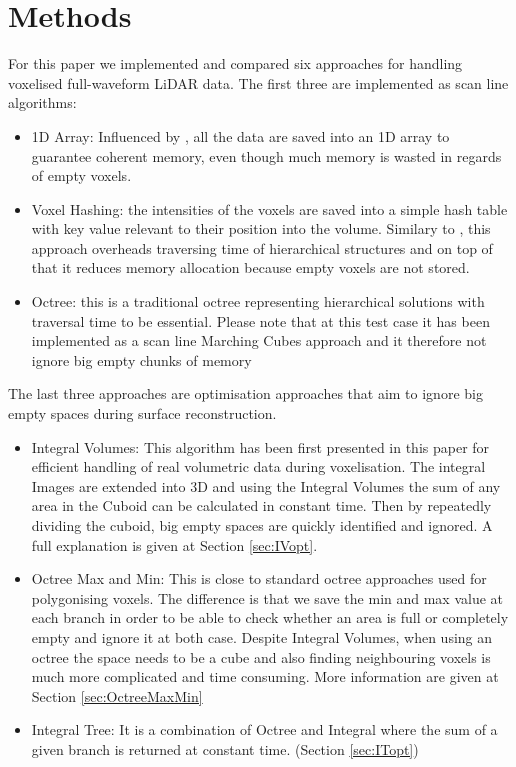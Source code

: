 \documentclass{subfiles}
\begin{document}




\section{Methods}\label{sec:methods}
For this paper we implemented and compared six approaches for handling voxelised full-waveform LiDAR data. The first three are implemented as scan line algorithms: 

\begin{itemize}
	\item 1D Array: Influenced by \cite{Hadwiger2012}, all the data are saved into an 1D array to guarantee coherent memory, even though much memory is wasted in regards of empty voxels.  
	\item Voxel Hashing: the intensities of the voxels are saved into a simple hash table with key value relevant to their position into the volume. Similary to \cite{Nievner2016voxelHashing}, this approach overheads traversing time of hierarchical structures and on top of that it reduces memory allocation because empty voxels are not stored. 
	\item Octree: this is a traditional octree representing hierarchical solutions with traversal time to be essential. Please note that at this test case it has been implemented as a scan line Marching Cubes approach and it therefore not ignore big empty chunks of memory
\end{itemize}

The last three approaches are optimisation approaches that aim to ignore big empty spaces during surface reconstruction. 
\begin{itemize}
	\item Integral Volumes: This algorithm has been first presented in this paper for efficient handling of real volumetric data during voxelisation. The integral Images are extended into 3D and using the Integral Volumes the sum of any area in the Cuboid can be calculated in constant time. Then by repeatedly dividing the cuboid, big empty spaces are quickly identified and ignored.  A full explanation is given at Section \ref{sec:IVopt}.
	\item Octree Max and Min: This is close to standard octree approaches used for polygonising voxels. The difference is that we save the min and max value at each branch in order to be able to check whether an area is full or completely empty and ignore it at both case. Despite Integral Volumes, when using an octree the space needs to be a cube and also finding neighbouring voxels is much more complicated and time consuming. More information are given at Section \ref{sec:OctreeMaxMin}
	\item Integral Tree: It is a combination of Octree and Integral where the sum of a given branch is returned at constant time. (Section \ref{sec:ITopt})
\end{itemize}
\end{document}
